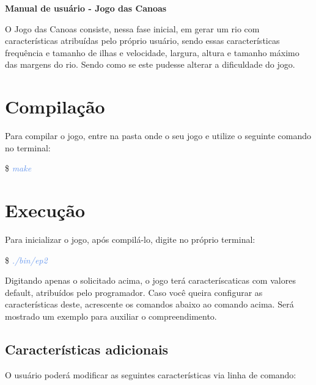 \documentclass[a4paper,12pt]{article}
\begin{document}
  \begin{center} 
	{\LARGE \textcolor{NavyBlue}{ \textbf{Manual de usuário - Jogo das Canoas}}}
  \end{center}

  \bigskip
  \bigskip

  O Jogo das Canoas consiste, nessa fase inicial, em gerar um rio com 
  características atribuídas pelo próprio usuário, sendo essas características 
  frequência e tamanho de ilhas e velocidade, largura, altura e tamanho máximo 
  das margens do rio. Sendo como se este pudesse alterar a dificuldade do jogo.


\newpage %
\section{\textcolor{NavyBlue}{Compilação}}

Para compilar o jogo, entre na pasta onde o seu jogo e utilize o seguinte comando no terminal:

\$ \textcolor{CornflowerBlue}{\textit{make}}

\bigskip
\section{\textcolor{NavyBlue}{Execução}}

  Para inicializar o jogo, após compilá-lo, digite no próprio terminal:
  
  \$ \textcolor{CornflowerBlue}{\textit{./bin/ep2}}
  
  Digitando apenas o solicitado acima, o jogo terá caracteríscaticas com valores 
  default, atribuídos pelo programador. Caso você queira configurar as características
  deste, acrescente os comandos abaixo ao comando acima. Será mostrado um exemplo para
  auxiliar o compreendimento.


  \bigskip
  \subsection{\textcolor{NavyBlue}{Características adicionais}}

  O usuário poderá modificar as seguintes características via linha de comando:
\end{document}

